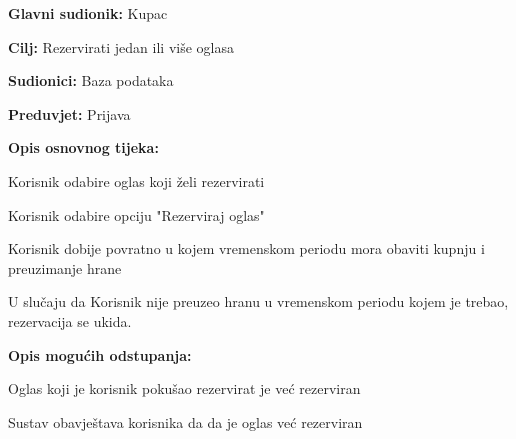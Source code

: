 					
					\noindent {}
					\begin{packed_item}
						
						\item \textbf{Glavni sudionik: } Kupac
						\item  \textbf{Cilj:} Rezervirati jedan ili više oglasa
						\item  \textbf{Sudionici:} Baza podataka
						\item  \textbf{Preduvjet:} Prijava
						\item  \textbf{Opis osnovnog tijeka:} 
						
						\item[] \begin{packed_enum}
							
							\item Korisnik odabire oglas koji želi rezervirati
							\item Korisnik odabire opciju "Rezerviraj oglas"
							\item Korisnik dobije povratno u kojem vremenskom periodu mora obaviti kupnju i preuzimanje hrane
							
							\item U slučaju da Korisnik nije preuzeo hranu u vremenskom periodu kojem je trebao, rezervacija se ukida.
							
						\end{packed_enum}
						
						\item  \textbf{Opis mogućih odstupanja:}
						
						\item[] \begin{packed_item}
							
							\item[2.a] Oglas koji je korisnik pokušao rezervirat je već rezerviran
							\item[] \begin{packed_enum}
								
								\item Sustav obavještava korisnika da da je oglas već rezerviran
								
							\end{packed_enum}
						\end{packed_item}
					\end{packed_item}
					
					
					
